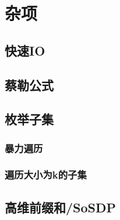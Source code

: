 \documentclass{article}
\begin{document}
\section{杂项}
\subsection{快速IO}

\subsection{蔡勒公式}

\subsection{枚举子集}
\subsubsection{暴力遍历}

\subsubsection{遍历大小为k的子集}

\subsection{高维前缀和/SoSDP}

\end{document}
